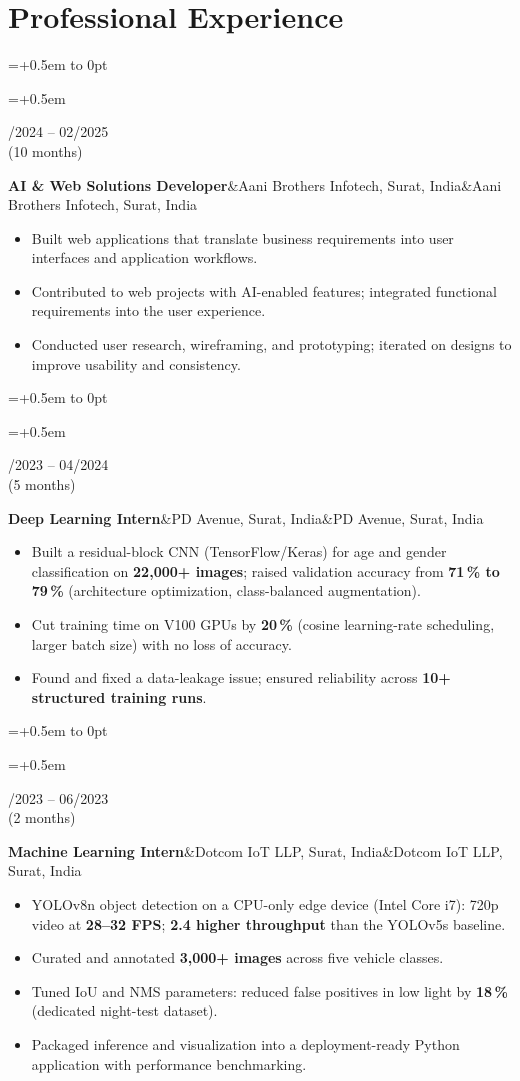 \documentclass[10pt,a4paper]{article}
\newlength{\leftcol}\setlength{\leftcol}{2.45cm}
\newcommand{\gap}{0.5em}
\newcommand{\sep}{\hspace{0.45em}\textbar\hspace{0.45em}}
\newcommand{\entry}[3]{%
  \begingroup\raggedright\leftskip=\dimexpr\leftcol+\gap\relax\noindent
  \hspace*{-\dimexpr\leftcol+\gap\relax}%
  \vtop to 0pt{\hsize=\dimexpr\leftcol+\gap\relax\raggedright\small\color{mid}\noindent #1\par\vss}%
  #2\par #3\par\endgroup\vspace{4pt}}
\newcommand{\etitle}[2]{\textbf{#1}\ifx&#2&\else\textcolor{mid}{\sep}#2\fi}
\begin{document}
\section*{Professional Experience}
\entry{05/2024 -- 02/2025\\(10 months)}
  {\etitle{AI \& Web Solutions Developer}{Aani Brothers Infotech, Surat, India}}
  {\begin{itemize}
    \item Built web applications that translate business requirements into user interfaces and application workflows.
    \item Contributed to web projects with AI-enabled features; integrated functional requirements into the user experience.
    \item Conducted user research, wireframing, and prototyping; iterated on designs to improve usability and consistency.
  \end{itemize}}
\entry{12/2023 -- 04/2024\\(5 months)}
  {\etitle{Deep Learning Intern}{PD Avenue, Surat, India}}
  {\begin{itemize}
    \item Built a residual-block CNN (TensorFlow/Keras) for age and gender classification on \textbf{22,000+ images}; raised validation accuracy from \textbf{71\,\% to 79\,\%} (architecture optimization, class-balanced augmentation).
    \item Cut training time on V100 GPUs by \textbf{20\,\%} (cosine learning-rate scheduling, larger batch size) with no loss of accuracy.
    \item Found and fixed a data-leakage issue; ensured reliability across \textbf{10+ structured training runs}.
  \end{itemize}}
\entry{05/2023 -- 06/2023\\(2 months)}
  {\etitle{Machine Learning Intern}{Dotcom IoT LLP, Surat, India}}
  {\begin{itemize}
    \item YOLOv8n object detection on a CPU-only edge device (Intel Core i7): 720p video at \textbf{28--32 FPS}; \textbf{2.4\texttimes{} higher throughput} than the YOLOv5s baseline.
    \item Curated and annotated \textbf{3,000+ images} across five vehicle classes.
    \item Tuned IoU and NMS parameters: reduced false positives in low light by \textbf{18\,\%} (dedicated night-test dataset).
    \item Packaged inference and visualization into a deployment-ready Python application with performance benchmarking.
  \end{itemize}}
\end{document}
